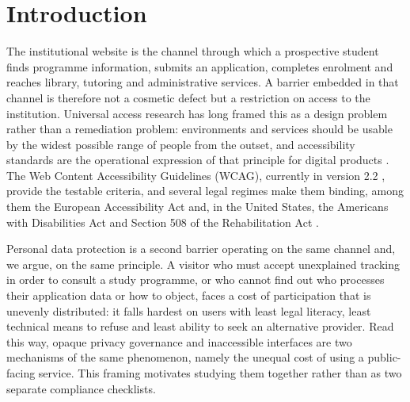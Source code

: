 \documentclass[pdflatex,sn-basic,Numbered]{sn-jnl}
\theoremstyle{thmstyleone}
\theoremstyle{thmstyletwo}
\theoremstyle{thmstylethree}
\begin{document}

\maketitle

\section{Introduction}\label{sec:introduction}

The institutional website is the channel through which a prospective student finds programme information, submits an application, completes enrolment and reaches library, tutoring and administrative services. A barrier embedded in that channel is therefore not a cosmetic defect but a restriction on access to the institution. Universal access research has long framed this as a design problem rather than a remediation problem: environments and services should be usable by the widest possible range of people from the outset, and accessibility standards are the operational expression of that principle for digital products \citep{hermosaramirez2025universal}. The Web Content Accessibility Guidelines (WCAG), currently in version 2.2 \citep{wcag22}, provide the testable criteria, and several legal regimes make them binding, among them the European Accessibility Act \citep{eaa2019} and, in the United States, the Americans with Disabilities Act and Section 508 of the Rehabilitation Act \citep{ada1990,section508}.

Personal data protection is a second barrier operating on the same channel and, we argue, on the same principle. A visitor who must accept unexplained tracking in order to consult a study programme, or who cannot find out who processes their application data or how to object, faces a cost of participation that is unevenly distributed: it falls hardest on users with least legal literacy, least technical means to refuse and least ability to seek an alternative provider. Read this way, opaque privacy governance and inaccessible interfaces are two mechanisms of the same phenomenon, namely the unequal cost of using a public-facing service. This framing motivates studying them together rather than as two separate compliance checklists.
\end{document}
